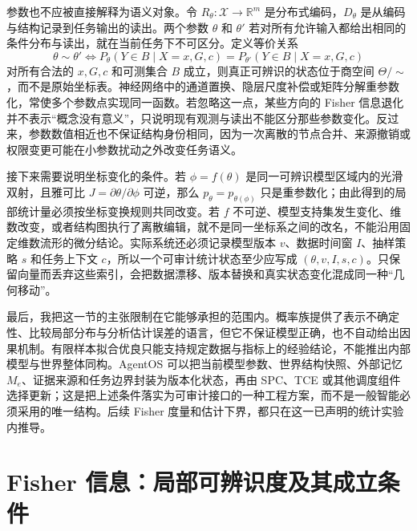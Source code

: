 参数也不应被直接解释为语义对象。令 $R_\theta:\mathcal X\to\mathbb R^m$ 是分布式编码，$D_\theta$ 是从编码与结构记录到任务输出的读出。两个参数 $\theta$ 和 $\theta'$ 若对所有允许输入都给出相同的条件分布与读出，就在当前任务下不可区分。定义等价关系
\begin{equation}
    \theta\sim\theta'
    \Longleftrightarrow
    P_\theta(Y\in B\mid X=x,G,c)
    =P_{\theta'}(Y\in B\mid X=x,G,c)
\end{equation}
对所有合法的 $x,G,c$ 和可测集合 $B$ 成立，则真正可辨识的状态位于商空间 $\Theta/{\sim}$，而不是原始坐标表。神经网络中的通道置换、隐层尺度补偿或矩阵分解重参数化，常使多个参数点实现同一函数。若忽略这一点，某些方向的 Fisher 信息退化并不表示“概念没有意义”，只说明现有观测与读出不能区分那些参数变化。反过来，参数数值相近也不保证结构身份相同，因为一次离散的节点合并、来源撤销或权限变更可能在小参数扰动之外改变任务语义。

接下来需要说明坐标变化的条件。若 $\phi=f(\theta)$ 是同一可辨识模型区域内的光滑双射，且雅可比 $J=\partial\theta/\partial\phi$ 可逆，那么 $p_\theta=p_{\theta(\phi)}$ 只是重参数化；由此得到的局部统计量必须按坐标变换规则共同改变。若 $f$ 不可逆、模型支持集发生变化、维数改变，或者结构图执行了离散编辑，就不是同一坐标系之间的改名，不能沿用固定维数流形的微分结论。实际系统还必须记录模型版本 $v$、数据时间窗 $I$、抽样策略 $s$ 和任务上下文 $c$，所以一个可审计统计状态至少应写成 $(\theta,v,I,s,c)$。只保留向量而丢弃这些索引，会把数据漂移、版本替换和真实状态变化混成同一种“几何移动”。

最后，我把这一节的主张限制在它能够承担的范围内。概率族提供了表示不确定性、比较局部分布与分析估计误差的语言，但它不保证模型正确，也不自动给出因果机制。有限样本拟合优良只能支持规定数据与指标上的经验结论，不能推出内部模型与世界整体同构。AgentOS 可以把当前模型参数、世界结构快照、外部记忆 $M_e$、证据来源和任务边界封装为版本化状态，再由 SPC、TCE 或其他调度组件选择更新；这是把上述条件落实为可审计接口的一种工程方案，而不是一般智能必须采用的唯一结构。后续 Fisher 度量和估计下界，都只在这一已声明的统计实验内推导。

\section{Fisher 信息：局部可辨识度及其成立条件}
\label{sec:section_1922}

